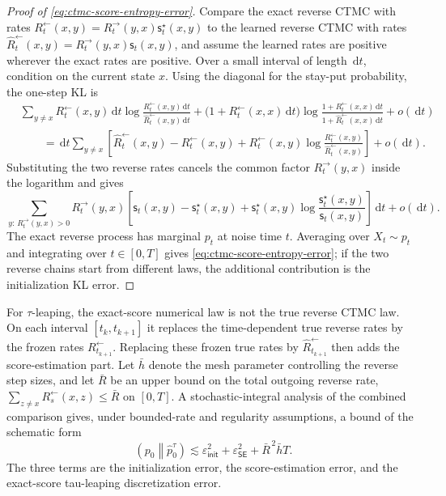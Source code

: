 \documentclass{amsart}
\numberwithin{equation}{section}
\theoremstyle{plain}
\theoremstyle{definition}
\theoremstyle{remark}
\DeclareMathOperator{\KL}{D_{\mathsf{KL}}}
\newcommand{\dd}{\,\mathrm{d}}
\newcommand{\wh}[1]{\widehat{#1}}
\newcommand{\sstar}{\mathsf{s}^{\star}}
\newcommand{\score}{\mathsf{s}}
\newcommand{\epsinit}{\varepsilon_{\mathsf{init}}}
\newcommand{\epsSE}{\varepsilon_{\mathsf{SE}}}
\begin{document}
\begin{proof}[Proof of \eqref{eq:ctmc-score-entropy-error}]
Compare the exact reverse CTMC with rates
$R_t^{\leftarrow}(x,y)=R_t^{\to}(y,x)\sstar_t(x,y)$ to the learned reverse CTMC
with rates
$\wh R_t^{\leftarrow}(x,y)=R_t^{\to}(y,x)\score_t(x,y)$, and assume the learned
rates are positive wherever the exact rates are positive.  Over a small interval
of length $\dd t$, condition on the current state $x$.  Using the diagonal for
the stay-put probability, the one-step KL is
\[
\begin{aligned}
    &\sum_{y\neq x}R_t^{\leftarrow}(x,y)\dd t
    \log
    \frac{R_t^{\leftarrow}(x,y)\dd t}
         {\wh R_t^{\leftarrow}(x,y)\dd t}
    +
    \bigl(1+R_t^{\leftarrow}(x,x)\dd t\bigr)
    \log
    \frac{1+R_t^{\leftarrow}(x,x)\dd t}
         {1+\wh R_t^{\leftarrow}(x,x)\dd t}
    +o(\dd t)  \\
    &\qquad=
    \dd t
    \sum_{y\neq x}
    \left[
    \wh R_t^{\leftarrow}(x,y)-R_t^{\leftarrow}(x,y)
    +R_t^{\leftarrow}(x,y)
    \log
    \frac{R_t^{\leftarrow}(x,y)}
         {\wh R_t^{\leftarrow}(x,y)}
    \right]
    +o(\dd t).
\end{aligned}
\]
Substituting the two reverse rates cancels the common factor
$R_t^{\to}(y,x)$ inside the logarithm and gives
\[
    \sum_{y:\,R_t^{\to}(y,x)>0}
    R_t^{\to}(y,x)
    \left[
    \score_t(x,y)-\sstar_t(x,y)
    +\sstar_t(x,y)\log\frac{\sstar_t(x,y)}{\score_t(x,y)}
    \right]\dd t
    +o(\dd t).
\]
The exact reverse process has marginal $p_t$ at noise time $t$.  Averaging over
$X_t\sim p_t$ and integrating over $t\in[0,T]$ gives
\eqref{eq:ctmc-score-entropy-error}; if the two reverse chains start from
different laws, the additional contribution is the initialization KL error.
\end{proof}

For $\tau$-leaping, the exact-score numerical law is not the true reverse CTMC
law.  On each interval $[t_k,t_{k+1}]$ it replaces the time-dependent true
reverse rates by the frozen rates $R_{t_{k+1}}^{\leftarrow}$.  Replacing these
frozen true rates by $\wh R_{t_{k+1}}^{\leftarrow}$ then adds the
score-estimation part.  Let $\bar h$ denote the mesh parameter controlling the
reverse step sizes, and let $\bar R$ be an upper bound on the total outgoing
reverse rate,
$\sum_{z\neq x}R_s^{\leftarrow}(x,z)\leq\bar R$ on $[0,T]$.  A
stochastic-integral analysis of the combined comparison gives, under
bounded-rate and regularity assumptions, a bound of the schematic form
\begin{equation}\label{eq:tau-leaping-kl-general}
    \KL\!\left(p_0\middle\|\wh p_0^\tau\right)
    \lesssim
    \epsinit^2
    +\epsSE^2
    +\bar R^{\,2}\bar h T.
\end{equation}
The three terms are the initialization error, the score-estimation error, and
the exact-score tau-leaping discretization error.
\end{document}

